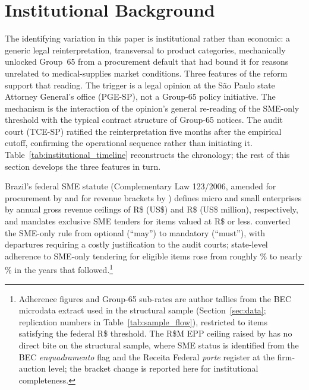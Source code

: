 \section{Institutional Background}\label{sec:institutional}

The identifying variation in this paper is institutional rather than economic: a generic legal reinterpretation, transversal to product categories, mechanically unlocked Group~65 from a procurement default that had bound it for reasons unrelated to medical-supplies market conditions. Three features of the reform support that reading. The trigger is a legal opinion at the São Paulo state Attorney General's office (PGE-SP), not a Group-65 policy initiative. The mechanism is the interaction of the opinion's general re-reading of the SME-only threshold with the typical contract structure of Group-65 notices. The audit court (TCE-SP) ratified the reinterpretation five months after the empirical cutoff, confirming the operational sequence rather than initiating it. Table~\ref{tab:institutional_timeline} reconstructs the chronology; the rest of this section develops the three features in turn.

Brazil's federal SME statute (Complementary Law 123/2006, amended for procurement by \LCSetAsideAct{} and for revenue brackets by \LCRevenueAct{}) defines micro and small enterprises by annual gross revenue ceilings of R\$\MERevCeilingBRL{} (US\$\MERevCeilingUSD{}) and R\$\EPPRevCeilingBRL{} (US\$\EPPRevCeilingUSD{} million), respectively, and mandates exclusive SME tenders for items valued at R\$\setAsideThreshBRL{} or less. \LCSetAsideAct{} converted the SME-only rule from optional (``may'') to mandatory (``must''), with departures requiring a costly justification to the audit courts; state-level adherence to SME-only tendering for eligible items rose from roughly \adherencePreLC\% to nearly \adherencePostLC\% in the years that followed.\footnote{Adherence figures and Group-65 sub-rates are author tallies from the BEC microdata extract used in the structural sample (Section~\ref{sec:data}; replication numbers in Table~\ref{tab:sample_flow}), restricted to items satisfying the federal R\$\setAsideThreshBRL{} threshold. The R\$\EPPRevCeilingUSD M EPP ceiling raised by \LCRevenueAct{} has no direct bite on the structural sample, where SME status is identified from the BEC \emph{enquadramento} flag and the Receita Federal \emph{porte} register at the firm-auction level; the bracket change is reported here for institutional completeness.}

